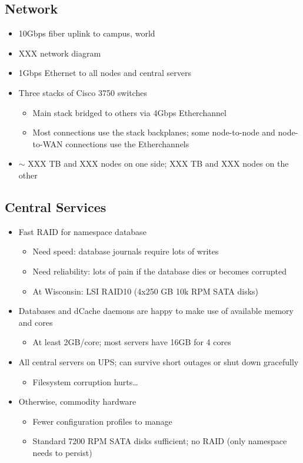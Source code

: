 \documentclass{beamer}
\newcommand{\ca}{\ensuremath{\sim}}
\begin{document}
\subsection{Network}
\begin{frame}
\begin{itemize}
	\item 10Gbps fiber uplink to campus, world
	\item XXX network diagram
	\item 1Gbps Ethernet to all nodes and central servers
	\item Three stacks of Cisco 3750 switches
	\begin{itemize}
		\item Main stack bridged to others via 4Gbps Etherchannel
		\item Most connections use the stack backplanes; some node-to-node and node-to-WAN connections use the Etherchannels
	\end{itemize}
	\item \ca{} XXX TB and XXX nodes on one side; XXX TB and XXX nodes on the other
\end{itemize}
\end{frame}

\subsection{Central Services}
\begin{frame}
\begin{itemize}
	\item Fast RAID for namespace database
	\begin{itemize}
		\item Need speed: database journals require lots of writes
		\item Need reliability: lots of pain if the database dies or becomes corrupted
		\item At Wisconsin: LSI RAID10 (4x250 GB 10k RPM SATA disks)
	\end{itemize}
	\item Databases and dCache daemons are happy to make use of available memory and cores
	\begin{itemize}
		\item At least 2GB/core; most servers have 16GB for 4 cores
	\end{itemize}
	\item All central servers on UPS; can survive short outages or shut down gracefully
	\begin{itemize}
		\item Filesystem corruption hurts\ldots{}
	\end{itemize}
	\item Otherwise, commodity hardware
	\begin{itemize}
		\item Fewer configuration profiles to manage
		\item Standard 7200 RPM SATA disks sufficient; no RAID (only namespace needs to persist)
	\end{itemize}
\end{itemize}
\end{frame}
\end{document}
